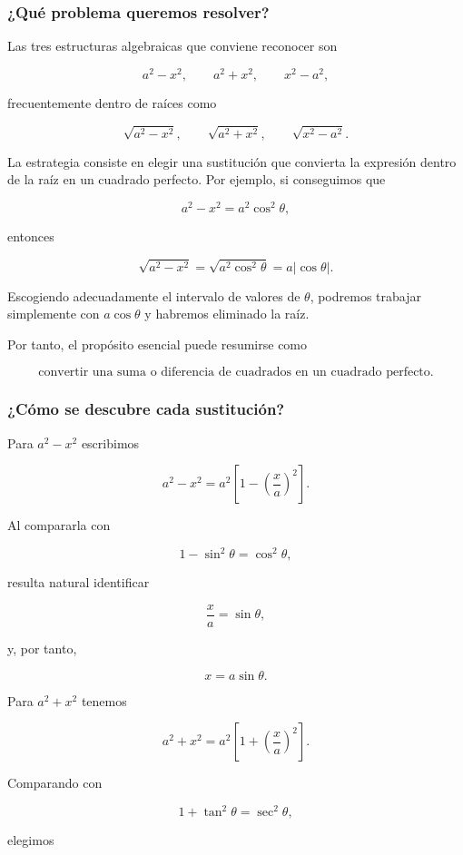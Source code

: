 \documentclass[12pt]{article}
\theoremstyle{definition}
\theoremstyle{remark}
\begin{document}
\subsubsection*{¿Qué problema queremos resolver?}

Las tres estructuras algebraicas que conviene reconocer son

\[
\boxed{a^2-x^2},\qquad
\boxed{a^2+x^2},\qquad
\boxed{x^2-a^2},
\]

frecuentemente dentro de raíces como

\[
\sqrt{a^2-x^2},\qquad
\sqrt{a^2+x^2},\qquad
\sqrt{x^2-a^2}.
\]

La estrategia consiste en elegir una sustitución que convierta la expresión
dentro de la raíz en un cuadrado perfecto. Por ejemplo, si conseguimos que

\[
a^2-x^2=a^2\cos^2\theta,
\]

entonces

\[
\sqrt{a^2-x^2}=\sqrt{a^2\cos^2\theta}=a|\cos\theta|.
\]

Escogiendo adecuadamente el intervalo de valores de $\theta$, podremos
trabajar simplemente con $a\cos\theta$ y habremos eliminado la raíz.

Por tanto, el propósito esencial puede resumirse como

\[
\boxed{\text{convertir una suma o diferencia de cuadrados en un cuadrado perfecto}.}
\]

\subsubsection*{¿Cómo se descubre cada sustitución?}

Para $a^2-x^2$ escribimos

\[
a^2-x^2=a^2\left[1-\left(\frac{x}{a}\right)^2\right].
\]

Al compararla con

\[
1-\sin^2\theta=\cos^2\theta,
\]

resulta natural identificar

\[
\frac{x}{a}=\sin\theta,
\]

y, por tanto,

\[
\boxed{x=a\sin\theta}.
\]

Para $a^2+x^2$ tenemos

\[
a^2+x^2=a^2\left[1+\left(\frac{x}{a}\right)^2\right].
\]

Comparando con

\[
1+\tan^2\theta=\sec^2\theta,
\]

elegimos
\end{document}
